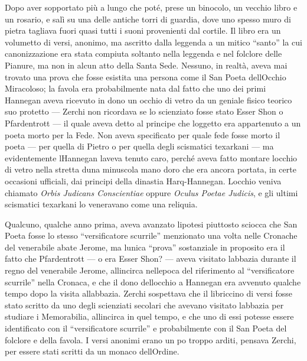 Dopo aver sopportato più a lungo che poté, prese un binocolo, un vecchio
libro e un rosario, e salì su una delle antiche torri di guardia, dove
uno spesso muro di pietra tagliava fuori quasi tutti i suoni provenienti
dal cortile. Il libro era un volumetto di versi, anonimo, ma ascritto
dalla leggenda a un mitico ``santo'' la cui canonizzazione era stata
compiuta soltanto nella leggenda e nel folclore delle Pianure, ma non in
alcun atto della Santa Sede. Nessuno, in realtà, aveva mai trovato una
prova che fosse esistita una persona come il San Poeta
dell\textquotesingle Occhio Miracoloso; la favola era probabilmente nata
dal fatto che uno dei primi Hannegan aveva ricevuto in dono un occhio di
vetro da un geniale fisico teorico suo protetto --- Zerchi non ricordava
se lo scienziato fosse stato Esser Shon o Pfardentrott --- il quale
aveva detto al principe che l\textquotesingle oggetto era appartenuto a
un poeta morto per la Fede. Non aveva specificato per quale fede fosse
morto il poeta --- per quella di Pietro o per quella degli scismatici
texarkani --- ma evidentemente l\textquotesingle Hannegan
l\textquotesingle aveva tenuto caro, perché aveva fatto montare
l\textquotesingle occhio di vetro nella stretta d\textquotesingle una
minuscola mano d\textquotesingle oro che era ancora portata, in certe
occasioni ufficiali, dai principi della dinastia Harq-Hannegan.
L\textquotesingle occhio veniva chiamato \emph{Orbis Judicans
	Conscientiae} oppure \emph{Oculus Poetae Judicis}, e gli ultimi
scismatici texarkani lo veneravano come una reliquia.

Qualcuno, qualche anno prima, aveva avanzato l\textquotesingle ipotesi
piuttosto sciocca che San Poeta fosse lo stesso ``versificatore
scurrile'' menzionato una volta nelle Cronache del venerabile abate
Jerome, ma l\textquotesingle unica ``prova'' sostanziale in proposito
era il fatto che Pfardentrott --- o era Esser Shon? --- aveva visitato
l\textquotesingle abbazia durante il regno del venerabile Jerome,
all\textquotesingle incirca nell\textquotesingle epoca del riferimento
al ``versificatore scurrile'' nella Cronaca, e che il dono
dell\textquotesingle occhio a Hannegan era avvenuto qualche tempo dopo
la visita all\textquotesingle abbazia. Zerchi sospettava che il
libriccino di versi fosse stato scritto da uno degli scienziati secolari
che avevano visitato l\textquotesingle abbazia per studiare i
Memorabilia, all\textquotesingle incirca in quel tempo, e che uno di
essi potesse essere identificato con il ``versificatore scurrile'' e
probabilmente con il San Poeta del folclore e della favola. I versi
anonimi erano un po\textquotesingle{} troppo arditi, pensava Zerchi, per
essere stati scritti da un monaco dell\textquotesingle Ordine.

